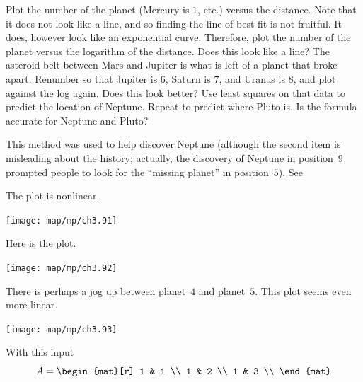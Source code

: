 \begin{exercises}
\begin{center}
     \end{center}
    \begin{exparts}
      \partsitem Plot the number of the planet 
        (Mercury is \( 1 \), etc.) versus the distance.
        Note that it does not look like a line, and so finding the
        line of best fit is not fruitful.
      \partsitem It does, however look like an exponential curve. 
        Therefore, plot the number of the planet versus the
        logarithm of the distance.
        Does this look like a line?
      \partsitem The asteroid belt between Mars and
        Jupiter is 
        what is left of a planet that broke apart.
        Renumber so that Jupiter is $6$, Saturn is $7$, and Uranus is
        $8$, and plot against the log again.
        Does this look better?
      \partsitem Use least squares on that data to predict the 
       location of Neptune.
      \partsitem Repeat to predict where Pluto is.
      \partsitem Is the formula accurate for Neptune and Pluto? 
    \end{exparts}
    This method was used to help discover Neptune (although the second item is
    misleading about the history; actually, the discovery of Neptune 
    in position~$9$ 
    prompted people to look for the ``missing planet'' in position~$5$).
    See \cite{Gardner70}
      \begin{answer}
        \begin{exparts}
          \partsitem The plot is nonlinear.
            \begin{center}  \small
              \texttt{[image: map/mp/ch3.91]}
            \end{center}
          \partsitem Here is the plot.
           \begin{center}  \small
             \texttt{[image: map/mp/ch3.92]}
           \end{center}
           There is perhaps a jog up between planet~$4$ and planet~$5$.
          \partsitem This plot seems even more linear.
           \begin{center}  \small
             \texttt{[image: map/mp/ch3.93]}
           \end{center}
          \partsitem
            With this input
            \begin{equation*}
              A =  
              \begin{mat}[r]
                1 & 1 \\
                1 & 2 \\
                1 & 3 \\

\end{mat}
\end{equation*}
\end{exparts}
\end{answer}
\end{exercises}

